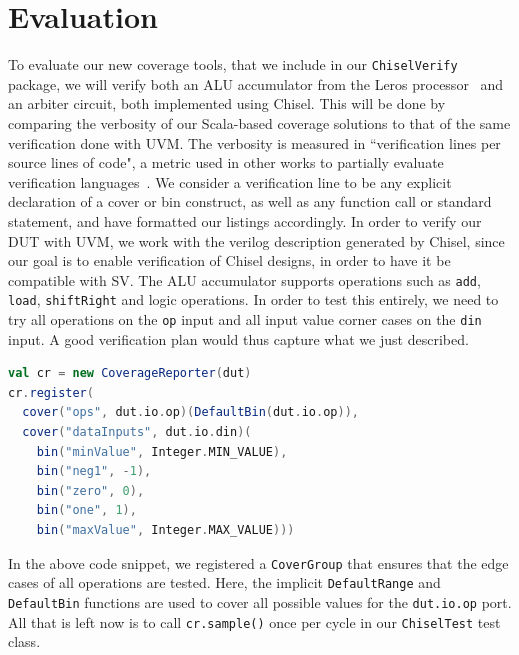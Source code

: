 \documentclass[conference]{IEEEtran}
\newcommand{\todo}[1]{{\color{olive} TODO: #1}}
\newcommand{\martin}[1]{{\color{blue} Martin: #1}}
\newcommand{\hjd}[1]{{\color{pink} Hans: #1}}
\begin{document}
\section{Evaluation}
To evaluate our new coverage tools, that we include in our \texttt{ChiselVerify} package, we will verify both an ALU accumulator from the Leros processor~\cite{leros:arcs2019} and an arbiter circuit, both implemented using Chisel. 
This will be done by comparing the verbosity of our Scala-based coverage solutions to that of the same verification done with UVM. 
The verbosity is measured in ``verification lines per source lines of code", a metric used in other works to partially evaluate verification languages~\cite{Nagini:2018, MuellerSchwerhoffSummers16}.
We consider a verification line to be any explicit declaration of a cover or bin construct, as well as any function call or standard statement, and have formatted our listings accordingly. 
In order to verify our DUT with UVM, we work with the verilog description generated by Chisel, since our goal is to enable verification of Chisel designs, in order to have it be compatible with SV.
The ALU accumulator supports operations such as \texttt{add}, \texttt{load}, \texttt{shiftRight} and logic operations. %
In order to test this entirely, we need to try all operations on the \texttt{op} input and all input value corner cases on the \texttt{din} input. %
A good verification plan would thus capture what we just described. 
\begin{lstlisting}[language=scala] 
val cr = new CoverageReporter(dut)  
cr.register(
  cover("ops", dut.io.op)(DefaultBin(dut.io.op)),
  cover("dataInputs", dut.io.din)(
    bin("minValue", Integer.MIN_VALUE),
    bin("neg1", -1),
    bin("zero", 0),
    bin("one", 1),
    bin("maxValue", Integer.MAX_VALUE)))
\end{lstlisting}
In the above code snippet, we registered a \texttt{CoverGroup} that ensures that the edge cases of all operations are tested.
Here, the implicit \texttt{DefaultRange} and \texttt{DefaultBin} functions are used to cover all possible values for the \texttt{dut.io.op} port.
All that is left now is to call \texttt{cr.sample()} once per cycle in our \texttt{ChiselTest} test class.
\end{document}
